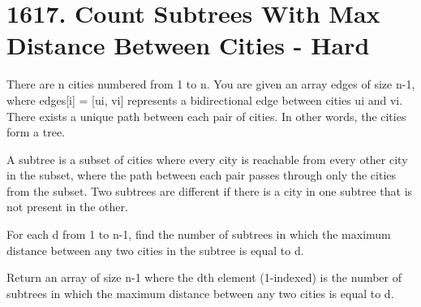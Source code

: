 \documentclass[9pt, b5paaper]{book}
\begin{document}
\section{1617. Count Subtrees With Max Distance Between Cities - Hard}
\label{sec-9-6}
There are n cities numbered from 1 to n. You are given an array edges of size n-1, where edges[i] = [ui, vi] represents a bidirectional edge between cities ui and vi. There exists a unique path between each pair of cities. In other words, the cities form a tree.

A subtree is a subset of cities where every city is reachable from every other city in the subset, where the path between each pair passes through only the cities from the subset. Two subtrees are different if there is a city in one subtree that is not present in the other.

For each d from 1 to n-1, find the number of subtrees in which the maximum distance between any two cities in the subtree is equal to d.

Return an array of size n-1 where the dth element (1-indexed) is the number of subtrees in which the maximum distance between any two cities is equal to d.
\end{document}
